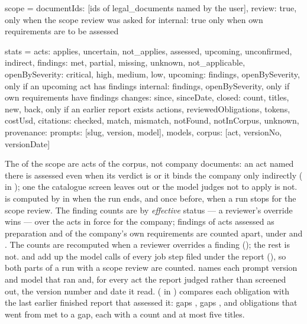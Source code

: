 \begin{codeblock}
scope = {documentIds: [ids of legal_documents named by the user],
         review: true,     only when the scope review was asked for
         internal: true}   only when own requirements are to be assessed

stats = {acts: {applies, uncertain, not_applies,
                assessed, upcoming, unconfirmed, indirect},
         findings: {met, partial, missing, unknown, not_applicable},
         openBySeverity: {critical, high, medium, low},
         upcoming: {findings, openBySeverity},  only if an upcoming act has findings
         internal: {findings, openBySeverity},  only if own requirements have findings
         changes: {since, sinceDate, closed: {count, titles}, new, back},
                                                 only if an earlier report exists
         actions, reviewedObligations, tokens, costUsd,
         citations: {checked, match, mismatch, notFound, notInCorpus, unknown},
         provenance: {prompts: [{slug, version, model}], models,
                      corpus: [{act, versionNo, versionDate}]}}
\end{codeblock}

The  of the scope are acts of the corpus, not company documents: an act
named there is assessed even when its verdict is  or it binds the company only
indirectly ( in ); one the catalogue screen
leaves out or the model judges not to apply is
not.  is computed by 
in  when the run ends, and once before, when a run stops for the
scope review. The finding counts are by \emph{effective} status --- a reviewer's override
wins --- over the acts in force for the company; findings of acts assessed as preparation and
of the company's own requirements are counted apart, under  and
. The counts are recomputed when a reviewer overrides a finding
(); the rest is not.  and  add up the model
calls of every job step filed under the report (), so both parts
of a run with a scope review are counted.  names each prompt version and
model that ran and, for every act the report judged rather than screened out, the version
number and date it read.  ( in )
compares each obligation with the last earlier finished report that assessed it: gaps
, gaps , and obligations that went  from met to a gap, each
with a count and at most five titles.


